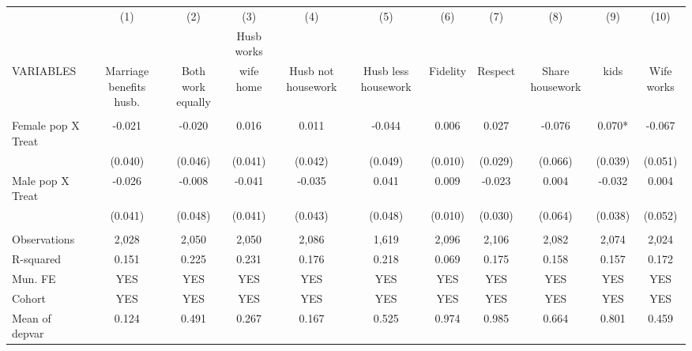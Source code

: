 \begin{tabular}{lcccccccccc} \hline
 & (1) & (2) & (3) & (4) & (5) & (6) & (7) & (8) & (9) & (10) \\
 &  &  & Husb works &  &  &  &  &  &  &  \\
VARIABLES & Marriage benefits husb. & Both work equally & wife home & Husb not housework & Husb less housework & Fidelity & Respect & Share housework & kids & Wife works \\ \hline
 &  &  &  &  &  &  &  &  &  &  \\
Female pop X Treat & -0.021 & -0.020 & 0.016 & 0.011 & -0.044 & 0.006 & 0.027 & -0.076 & 0.070* & -0.067 \\
 & (0.040) & (0.046) & (0.041) & (0.042) & (0.049) & (0.010) & (0.029) & (0.066) & (0.039) & (0.051) \\
Male pop X Treat & -0.026 & -0.008 & -0.041 & -0.035 & 0.041 & 0.009 & -0.023 & 0.004 & -0.032 & 0.004 \\
 & (0.041) & (0.048) & (0.041) & (0.043) & (0.048) & (0.010) & (0.030) & (0.064) & (0.038) & (0.052) \\
 &  &  &  &  &  &  &  &  &  &  \\
Observations & 2,028 & 2,050 & 2,050 & 2,086 & 1,619 & 2,096 & 2,106 & 2,082 & 2,074 & 2,024 \\
R-squared & 0.151 & 0.225 & 0.231 & 0.176 & 0.218 & 0.069 & 0.175 & 0.158 & 0.157 & 0.172 \\
Mun. FE & YES & YES & YES & YES & YES & YES & YES & YES & YES & YES \\
Cohort & YES & YES & YES & YES & YES & YES & YES & YES & YES & YES \\
 Mean of depvar & 0.124 & 0.491 & 0.267 & 0.167 & 0.525 & 0.974 & 0.985 & 0.664 & 0.801 & 0.459 \\ \hline
\end{tabular}
